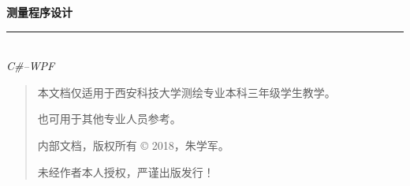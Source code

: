 ﻿%


\thispagestyle{empty}

\noindent\begin{minipage}{\textwidth}
\raggedleft
{\huge \bfseries 测量程序设计}
\noindent\rule[-1ex]{\textwidth}{5pt}\\[2.5ex]
\hfill\emph{\Large  C\#--WPF }
\end{minipage}

\noindent{}


\newpage\thispagestyle{empty}
\begin{quote}\footnotesize
    本文档仅适用于西安科技大学测绘专业本科三年级学生教学。

    也可用于其他专业人员参考。

    内部文档，版权所有 \copyright{}  2018，朱学军。

    未经作者本人授权，严谨出版发行！
\end{quote}